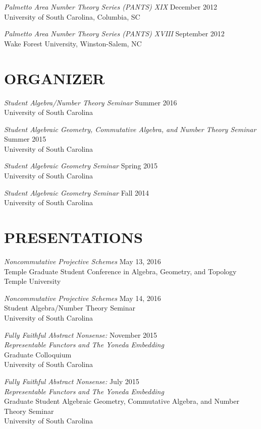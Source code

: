 \documentclass[line,overlapped]{res}
\begin{document}
\begin{resume}
         {\sl Palmetto Area Number Theory Series (PANTS) XIX} \hfill December 2012\\
         University of South Carolina, Columbia, SC

         {\sl Palmetto Area Number Theory Series (PANTS) XVIII} \hfill September 2012\\
         Wake Forest University, Winston-Salem, NC

 \section{ORGANIZER}
         {\sl Student Algebra/Number Theory Seminar} \hfill Summer 2016\\
	 University of South Carolina
         
	 {\sl Student Algebraic Geometry, Commutative Algebra, and Number Theory Seminar} \hfill Summer 2015\\
	 University of South Carolina
	 
         {\sl Student Algebraic Geometry Seminar} \hfill Spring 2015\\
	 University of South Carolina

         {\sl Student Algebraic Geometry Seminar} \hfill Fall 2014\\
	 University of South Carolina
        
         \newpage

 \section{PRESENTATIONS}
         {\sl Noncommutative Projective Schemes} \hfill May 13, 2016\\
         Temple Graduate Student Conference in Algebra, Geometry, and Topology\\
         Temple University

         {\sl Noncommutative Projective Schemes} \hfill May 14, 2016\\
         Student Algebra/Number Theory Seminar\\
         University of South Carolina

         {\sl Fully Faithful Abstract Nonsense:} \hfill November 2015\\
         {\sl Representable Functors and The Yoneda Embedding}\\
         Graduate Colloquium\\
         University of South Carolina

         {\sl Fully Faithful Abstract Nonsense:} \hfill July 2015\\
         {\sl Representable Functors and The Yoneda Embedding}\\
         Graduate Student Algebraic Geometry, Commutative Algebra, and Number Theory Seminar\\
         University of South Carolina


\end{resume}
\end{document}
